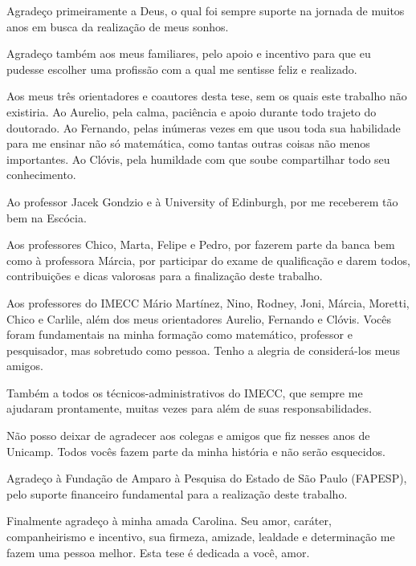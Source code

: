 

Agradeço primeiramente a Deus, o qual foi sempre suporte na jornada de muitos anos em busca da realização de meus sonhos.

Agradeço também aos meus familiares, pelo apoio  e  incentivo para que eu pudesse escolher uma profissão com a qual me sentisse feliz e realizado.

Aos meus três orientadores e coautores desta tese, sem os quais este trabalho não existiria. Ao Aurelio, pela calma, paciência e apoio durante todo trajeto do doutorado. Ao Fernando, pelas inúmeras vezes em que usou toda sua habilidade para me ensinar não só matemática, como  tantas outras  coisas não menos importantes. Ao Clóvis, pela humildade com que soube compartilhar todo seu conhecimento. 

Ao professor Jacek Gondzio e à University of Edinburgh, por me receberem tão bem na Escócia.


Aos professores Chico, Marta, Felipe e Pedro, por fazerem parte da banca bem como à professora Márcia, por participar do exame de qualificação e darem todos, contribuições e dicas valorosas para a finalização deste trabalho.

Aos professores do IMECC Mário Martínez, Nino, Rodney, Joni, Márcia, Moretti, Chico e Carlile,  além dos meus orientadores Aurelio, Fernando e Clóvis. Vocês foram fundamentais na minha formação como  matemático, professor e  pesquisador,  mas sobretudo como pessoa. Tenho a alegria de considerá-los meus amigos.  

Também a todos os técnicos-administrativos do IMECC, que  sempre me ajudaram prontamente, muitas vezes para além de suas responsabilidades.

Não posso deixar de agradecer aos  colegas e amigos que fiz nesses  anos de Unicamp. Todos vocês fazem parte da minha história e não serão esquecidos.

Agradeço  à Fundação de Amparo à Pesquisa do Estado de São Paulo (FAPESP), pelo suporte financeiro fundamental para a realização deste trabalho.

Finalmente agradeço à minha amada Carolina. Seu amor, caráter, companheirismo e incentivo, sua firmeza, amizade, lealdade e determinação me fazem uma pessoa melhor. Esta tese é dedicada a você, amor.

